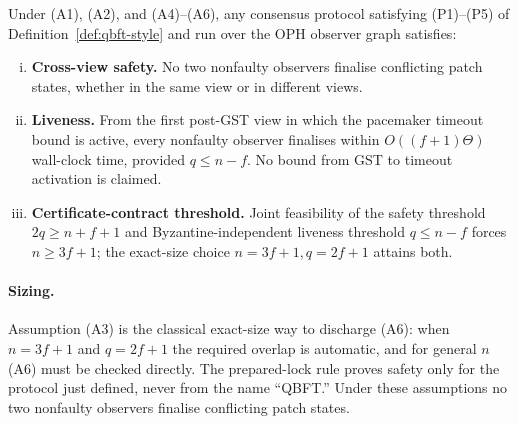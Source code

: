 \begin{theorem}
\label{thm:qbft-safety}
Under (A1), (A2), and (A4)--(A6), any consensus protocol satisfying
(P1)--(P5) of Definition~\ref{def:qbft-style} and run over the
\textrm{OPH} observer graph satisfies:
\begin{enumerate}[(i)]
  \item \textbf{Cross-view safety.} No two nonfaulty observers finalise
        conflicting patch states, whether in the same view or in different
        views.
  \item \textbf{Liveness.} From the first post-\textrm{GST} view in which the
        pacemaker timeout bound is active, every nonfaulty observer finalises
        within $O((f+1)\Theta)$ wall-clock time, provided \(q\le n-f\).
        No bound from \textrm{GST} to timeout activation is claimed.
  \item \textbf{Certificate-contract threshold.} Joint feasibility of the
        safety threshold \(2q\ge n+f+1\) and Byzantine-independent liveness
        threshold \(q\le n-f\) forces \(n\ge3f+1\); the exact-size choice
        \(n=3f+1,q=2f+1\) attains both.
\end{enumerate}
\end{theorem}

\paragraph{Sizing.}
Assumption (A3) is the classical exact-size way to discharge (A6): when
\(n=3f+1\) and \(q=2f+1\) the required overlap is automatic, and for general
\(n\) (A6) must be checked directly. The prepared-lock rule proves safety
only for the protocol just defined, never from the name ``QBFT.'' Under
these assumptions no two nonfaulty observers finalise conflicting patch
states.

